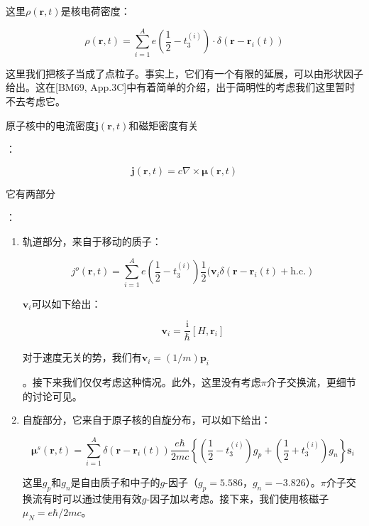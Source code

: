 这里$\rho(\boldsymbol{r},t)$是核电荷密度：

\begin{equation}
\rho(\boldsymbol{r},t)=\sum^{A}_{i=1}e\left(\frac{1}{2}-t^{(i)}_{3}\right)\cdot\delta(\boldsymbol{r}-\boldsymbol{r}_{i}(t))
\end{equation}

这里我们把核子当成了点粒子。事实上，它们有一个有限的延展，可以由形状因子给出。这在{[}BM69, App.3C{]}中有着简单的介绍，出于简明性的考虑我们这里暂时不去考虑它。

原子核中的电流密度$\boldsymbol{j}(\boldsymbol{r},t)$和磁矩密度有关

：

\begin{equation}
\boldsymbol{j}(\boldsymbol{r},t)=c\nabla\times\boldsymbol{\mu}(\boldsymbol{r},t)
\end{equation}

它有两部分

：
\begin{enumerate}
\item 轨道部分，来自于移动的质子：

\begin{equation}
j^{o}(\boldsymbol{r},t)=\sum^{A}_{i=1}e\left(\frac{1}{2}-t^{(i)}_{3}\right)\frac{1}{2}(\boldsymbol{v}_{i}\delta(\boldsymbol{r}-\boldsymbol{r}_{i}(t)+\text{h.c.})
\end{equation}

$\boldsymbol{v}_{i}$可以如下给出：

\begin{equation}
\boldsymbol{v}_{i}=\frac{\mathrm{i}}{\hbar}[H,\boldsymbol{r}_{i}]
\end{equation}

对于速度无关的势，我们有$\boldsymbol{v}_{i}=(1/m)\boldsymbol{p}_{i}$

。接下来我们仅仅考虑这种情况。此外，这里没有考虑$\pi$介子交换流，更细节的讨论可见\cite{SF74}。
\item 自旋部分，它来自于原子核的自旋分布，可以如下给出：

\begin{equation}
\boldsymbol{\mu}^{s}(\boldsymbol{r},t)=\sum^{A}_{i=1}\delta(\boldsymbol{r}-\boldsymbol{r}_{i}(t))\frac{e\hbar}{2mc}\left\{ \left(\frac{1}{2}-t^{(i)}_{3}\right)g_{p}+\left(\frac{1}{2}+t^{(i)}_{3}\right)g_{n}\right\} \boldsymbol{s}_{i}
\end{equation}

这里$g_{p}$和$g_{n}$是自由质子和中子的$g$-因子（$g_{p}=5.586$，$g_{n}=-3.826$）。$\pi$介子交换流有时可以通过使用有效$g$-因子加以考虑。接下来，我们使用核磁子$\mu_{N}=e\hbar/2mc$。
\end{enumerate}

